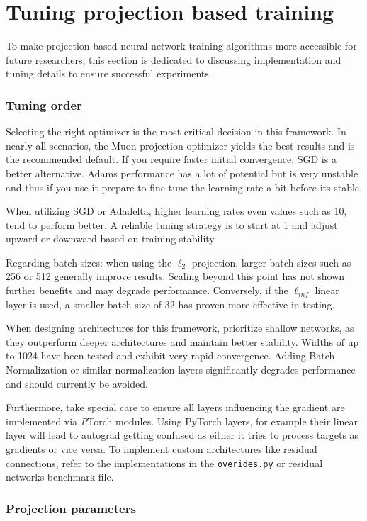 \documentclass{article}
\theoremstyle{plain}
\theoremstyle{definition}
\theoremstyle{remark}
\begin{document}
\section{Tuning projection based training}
To make projection-based neural network training algorithms more accessible for future researchers, this section is dedicated to discussing implementation and tuning details to ensure successful experiments.
\subsubsection{Tuning order}

Selecting the right optimizer is the most critical decision in this framework. In nearly all scenarios, the Muon projection optimizer yields the best results and is the recommended default. If you require faster initial convergence, SGD is a better alternative. Adams performance has a lot of potential but is very unstable and thus if you use it prepare to fine tune the learning rate a bit before its stable.

When utilizing SGD or Adadelta, higher learning rates even values such as 10, tend to perform better. A reliable tuning strategy is to start at 1 and adjust upward or downward based on training stability.

Regarding batch sizes: when using the $\ell_2$ projection, larger batch sizes such as 256 or 512 generally improve results. Scaling beyond this point has not shown further benefits and may degrade performance. Conversely, if the $\ell_{inf}$ linear layer is used, a smaller batch size of 32 has proven more effective in testing.

When designing architectures for this framework, prioritize shallow networks, as they outperform deeper architectures and maintain better stability. Widths of up to 1024 have been tested and exhibit very rapid convergence. Adding Batch Normalization or similar normalization layers significantly degrades performance and should currently be avoided.

Furthermore, take special care to ensure all layers influencing the gradient are implemented via  \emph{P}Torch modules. Using PyTorch layers, for example their linear layer will lead to autograd getting confused as either it tries to process targets as gradients or vice versa. To implement custom architectures like residual connections, refer to the implementations in the \texttt{overides.py} or residual networks benchmark file.

\subsubsection{Projection parameters}
\end{document}
